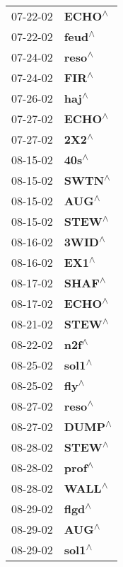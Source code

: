 \begin{supertabular}{p{0.08\textwidth}p{0.2\textwidth}}
 07-22-02 &    \textbf{ECHO\textsuperscript{$\wedge$}} \\
 07-22-02 &    \textbf{feud\textsuperscript{$\wedge$}} \\
 07-24-02 &    \textbf{reso\textsuperscript{$\wedge$}} \\
 07-24-02 &     \textbf{FIR\textsuperscript{$\wedge$}} \\
 07-26-02 &     \textbf{haj\textsuperscript{$\wedge$}} \\
 07-27-02 &    \textbf{ECHO\textsuperscript{$\wedge$}} \\
 07-27-02 &     \textbf{2X2\textsuperscript{$\wedge$}} \\
 08-15-02 &     \textbf{40s\textsuperscript{$\wedge$}} \\
 08-15-02 &    \textbf{SWTN\textsuperscript{$\wedge$}} \\
 08-15-02 &     \textbf{AUG\textsuperscript{$\wedge$}} \\
 08-15-02 &    \textbf{STEW\textsuperscript{$\wedge$}} \\
 08-16-02 &    \textbf{3WID\textsuperscript{$\wedge$}} \\
 08-16-02 &     \textbf{EX1\textsuperscript{$\wedge$}} \\
 08-17-02 &    \textbf{SHAF\textsuperscript{$\wedge$}} \\
 08-17-02 &    \textbf{ECHO\textsuperscript{$\wedge$}} \\
 08-21-02 &    \textbf{STEW\textsuperscript{$\wedge$}} \\
 08-22-02 &     \textbf{n2f\textsuperscript{$\wedge$}} \\
 08-25-02 &    \textbf{sol1\textsuperscript{$\wedge$}} \\
 08-25-02 &     \textbf{fly\textsuperscript{$\wedge$}} \\
 08-27-02 &    \textbf{reso\textsuperscript{$\wedge$}} \\
 08-27-02 &    \textbf{DUMP\textsuperscript{$\wedge$}} \\
 08-28-02 &    \textbf{STEW\textsuperscript{$\wedge$}} \\
 08-28-02 &    \textbf{prof\textsuperscript{$\wedge$}} \\
 08-28-02 &    \textbf{WALL\textsuperscript{$\wedge$}} \\
 08-29-02 &    \textbf{flgd\textsuperscript{$\wedge$}} \\
 08-29-02 &     \textbf{AUG\textsuperscript{$\wedge$}} \\
 08-29-02 &    \textbf{sol1\textsuperscript{$\wedge$}} \\

\end{supertabular}
